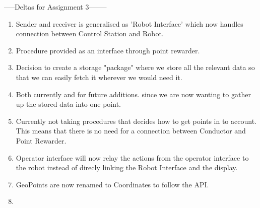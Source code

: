 

-----Deltas for Assignment 3--------
\begin{enumerate}
    \item Sender and receiver is generalised as 'Robot Interface' which now handles connection between Control Station and Robot.
    \item Procedure provided as an interface through point rewarder.
    \item Decision to create a storage "package" where we store all the relevant data so that we can easily fetch it wherever we would need it.
    \item Both currently and for future additions. since we are now wanting to gather up the stored data into one point.
    \item Currently not taking procedures that decides how to get points in to account. This means that there is no need for a connection between Conductor and Point Rewarder.
    \item Operator interface will now relay the actions from the operator interface to the robot instead of direcly linking the Robot Interface and the display.
    \item GeoPoints are now renamed to Coordinates to follow the API.
    \item 
\end{enumerate}


